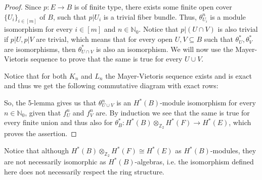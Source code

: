 \begin{proof}
Since $p:E\to B$ is of finite type, there exists some finite open cover $\{U_i\}_{i\in[m]}$ of $B$, such that $p|U_i$ is a trivial fiber bundle. Thus, $\theta_{U_i}^n$ is a module isomorphism for every $i\in[m]$ and $n\in\mathbb{N}_0$. Notice that $p|(U\cap V)$ is also trivial if $p|U,p|V$ are trivial, which means that for every open $U,V\subseteq B$ such that $\theta_U^*,\theta_V^*$ are isomorphisms, then $\theta_{U\cap V}^*$ is also an isomorphism. We will now use the Mayer-Vietoris sequence to prove that the same is true for every $U\cup V$.

Notice that for both $K_n$ and $L_n$ the Mayer-Vietoris sequence exists and is exact and thus we get the following commutative diagram with exact rows:%
\begin{center}
\end{center}
So, the 5-lemma gives us that $\theta_{U\cup V}^n$ is an $H^*(B)$-module isomorphism for every $n\in\mathbb{N}_0$, given that $f_U^n$ and $f_V^n$ are. By induction we see that the same is true for every finite union and thus also for $\theta_B^*:H^*(B)\otimes_{\mathbb{Z}_2}H^*(F)\to H^*(E)$, which proves the assertion.
\end{proof}
\begin{remark} Notice that although $H^*(B)\otimes_{\mathbb{Z}_2}H^*(F)\cong H^*(E)$ as $H^*(B)$-modules, they are not necessarily isomorphic as $H^*(B)$-algebras, i.e. the isomorphism defined here does not necessarily respect the ring structure.
\end{remark}

